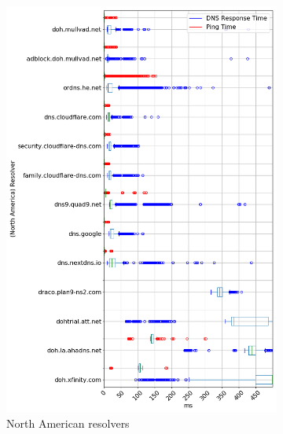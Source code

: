 \begin{figure}[t!]
    \centering
    \begin{subfigure}[t]{0.5\textwidth}
        \centering
        \includegraphics[width=\linewidth]{figures/Frankfurt_North_America.png}
        \caption{North American resolvers}
    \end{subfigure}%
    ~ 
    \begin{subfigure}[t]{0.5\textwidth}
        \centering

\end{subfigure}
\end{figure}
